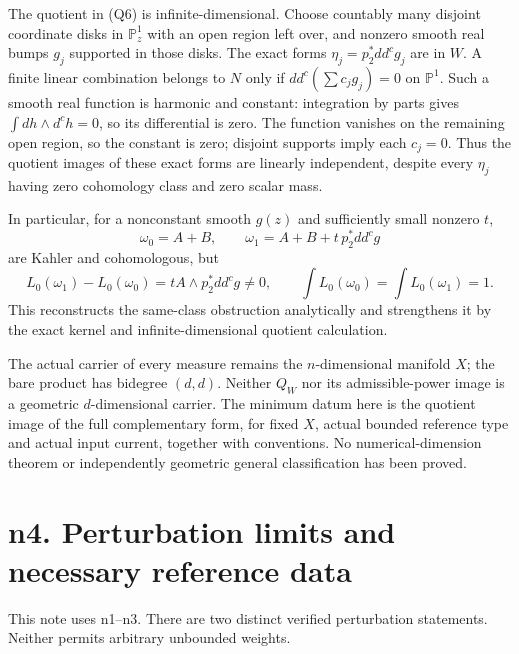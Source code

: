 \documentclass[
  11pt,
]{article}
\begin{document}
The quotient in (Q6) is infinite-dimensional. Choose countably many
disjoint coordinate disks in \(\mathbb P^1_z\) with an open region left
over, and nonzero smooth real bumps \(g_j\) supported in those disks.
The exact forms \(\eta_j=p_2^*dd^cg_j\) are in \(W\). A finite linear
combination belongs to \(N\) only if \(dd^c(\sum c_jg_j)=0\) on
\(\mathbb P^1\). Such a smooth real function is harmonic and constant:
integration by parts gives \(\int dh\wedge d^ch=0\), so its differential
is zero. The function vanishes on the remaining open region, so the
constant is zero; disjoint supports imply each \(c_j=0\). Thus the
quotient images of these exact forms are linearly independent, despite
every \(\eta_j\) having zero cohomology class and zero scalar mass.

In particular, for a nonconstant smooth \(g(z)\) and sufficiently small
nonzero \(t\), \[
\omega_0=A+B,\qquad\omega_1=A+B+t\,p_2^*dd^cg
\] are Kahler and cohomologous, but \[
L_0(\omega_1)-L_0(\omega_0)=tA\wedge p_2^*dd^cg\ne0,
\qquad\int L_0(\omega_0)=\int L_0(\omega_1)=1.
\] This reconstructs the same-class obstruction analytically and
strengthens it by the exact kernel and infinite-dimensional quotient
calculation.

The actual carrier of every measure remains the \(n\)-dimensional
manifold \(X\); the bare product has bidegree \((d,d)\). Neither \(Q_W\)
nor its admissible-power image is a geometric \(d\)-dimensional carrier.
The minimum datum here is the quotient image of the full complementary
form, for fixed \(X\), actual bounded reference type and actual input
current, together with conventions. No numerical-dimension theorem or
independently geometric general classification has been proved.

\section{n4. Perturbation limits and necessary reference data}\label{n4.-perturbation-limits-obstruction-and-residual-scope}

This note uses n1--n3. There are two distinct verified perturbation
statements. Neither permits arbitrary unbounded weights.
\end{document}
